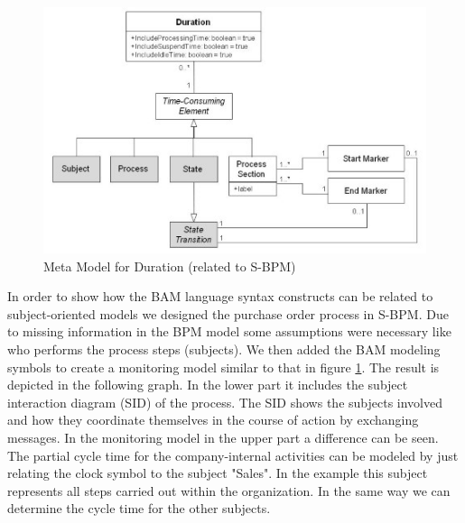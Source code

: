 \begin{figure}[h]
	\centering
	\includegraphics[width=0.9\linewidth]{Figures/Chapter5/Monitoring/Meta-Mode-fo-Duration-relate- to-SBPM.jpg}
	\caption[Meta Model for Duration (related to S-BPM)]{Meta Model for Duration (related to S-BPM)}
	\label{fig:Meta-Model-S_BPM}
\end{figure}


In order to show how the BAM language syntax constructs can be related to subject-oriented models we designed the purchase order process in S-BPM. Due to missing information in the BPM model some assumptions were necessary like who performs the process steps (subjects). We then added the BAM modeling symbols to create a monitoring model similar to that in figure \ref{fig:Meta-Model-S_BPM}.
The result is depicted in the following graph. In the lower part it includes the subject interaction diagram (SID) of the process. The SID shows the subjects involved and how they coordinate themselves in the course of action by exchanging messages. In the monitoring model in the upper part a difference can be seen. The partial cycle time for the company-internal activities can be modeled by just relating the clock symbol to the subject "Sales". In the example this subject represents all steps carried out within the organization. In the same way we can determine the cycle time for the other subjects.


